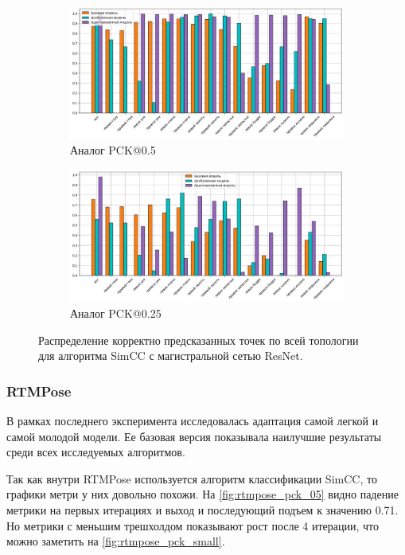 \begin{figure}[H]
\centering
\begin{subfigure}{.8\textwidth}
	\centering
	\includegraphics[width=\textwidth]{./images/results/simcc/simcc_05_s}
	\caption{Аналог PCK@0.5}
	\label{fig:simcc_distr_05}
\end{subfigure}
\begin{subfigure}{.8\textwidth}
	\centering
	\includegraphics[width=\textwidth]{./images/results/simcc/simcc_025_s}
	\caption{Аналог PCK@0.25}
	\label{fig:simcc_distr_025}
\end{subfigure}
\caption{Распределение корректно предсказанных точек по всей топологии для алгоритма SimCC с магистральной сетью ResNet.}
\label{fig:simcc_distr}
\end{figure}

\subsubsection*{RTMPose}

В рамках последнего эксперимента исследовалась адаптация самой легкой и самой молодой модели. Ее базовая версия показывала наилучшие результаты среди всех исследуемых алгоритмов.

Так как внутри RTMPose используется алгоритм классификации SimCC, то графики метри у них довольно похожи. На \autoref{fig:rtmpose_pck_05} видно падение метрики на первых итерациях и выход и последующий подъем к значению 0.71. Но метрики с меньшим трешхолдом показывают рост после 4 итерации, что можно заметить на \autoref{fig:rtmpose_pck_small}.  

